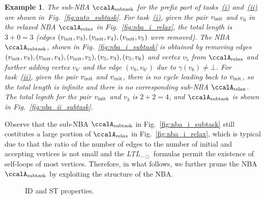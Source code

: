 \documentclass[Afour,sageh,times]{sagej}
\newtheorem{exmp}{Example}
\newcommand{\ltl}{ {\it LTL}$_{-\bigcirc}$ }
\newcommand{\auto}[1]{\ccalA_{\textup{#1}}}
\newcommand{\vertex}[1]{v_{\textup{#1}}}
\newenvironment{cexmp}
{\addtocounter{exmp}{-1}\begin{exmp}}
  {\end{exmp}}
\begin{document}
     \begin{cexmp}
       The sub-NBA $\auto{subtask}$ for the prefix part of tasks~\hyperref[task:i]{\it (i)} and~\hyperref[task:i]{\it (ii)} are shown in~Fig.~\ref{fig:auto_subtask}. For task~\hyperref[task:i]{\it (i)}, given the pair $\vertex{init}$ and $v_6$ in the relaxed NBA $\auto{relax}$ in Fig.~\ref{fig:nba_i_relax}, the total length is $3+0=3$ (edges $(\vertex{init}, v_3), (\vertex{init}, v_4), (\vertex{init}, v_5)$ were removed). The NBA $\auto{subtask}$, shown in  Fig.~\ref{fig:nba_i_subtask} is obtained by removing edges $(\vertex{init}, v_3), (\vertex{init}, v_4), (\vertex{init}, v_5), (v_5, v_3),  (v_5, v_6)$ and vertex $v_5$ from $\auto{relax}$ and further adding vertex $v_{6'}$ and the edge $(v_6, v_{6'})$ due to $\gamma(v_6)\neq \bot$. For task~\hyperref[task:i]{\it (ii)}, given the pair $\vertex{init}$ and $\vertex{init}$,  there is no cycle leading back to $\vertex{init}$, so the total length is infinite and there is no corresponding sub-NBA $\auto{relax}$. The total legnth for the pair $\vertex{init}$ and $v_3$ is $2+2=4$, and $\auto{subtask}$ is shown in  Fig.~\ref{fig:nba_ii_subtask}.
     \end{cexmp}

Observe that the sub-NBA $\auto{subtask}$ in Fig.~\ref{fig:nba_i_subtask} still costitutes a large portion of  $\auto{relax}$ in Fig.~\ref{fig:nba_i_relax}, which is typical due to that the ratio of the number of edges to the number of initial and accepting vertices is not small and the \ltl formulas permit the existence of self-loops of most vertices. Therefore, in what follows, we further prune the NBA $\auto{subtask}$  by exploiting the structure of the NBA.

\begin{figure}
  \centering
  \caption{ID and ST properties.}\label{fig:property}
\end{figure}
\end{document}
